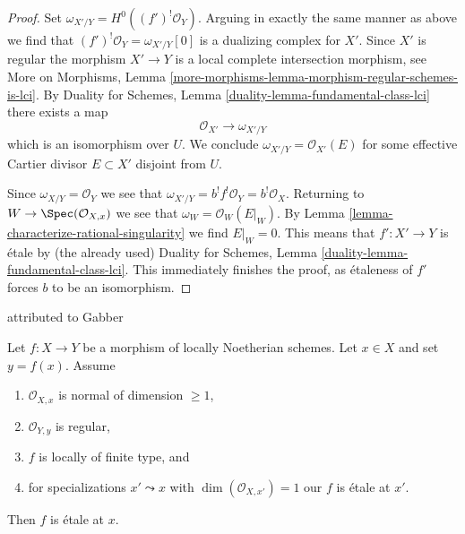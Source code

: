 \begin{proof}
\medskip\noindent
Set $\omega_{X'/Y} = H^0((f')^!\mathcal{O}_Y)$. Arguing in exactly the
same manner as above we find that $(f')^!\mathcal{O}_Y = \omega_{X'/Y}[0]$
is a dualizing complex for $X'$. Since $X'$ is regular
the morphism $X' \to Y$ is a local complete intersection morphism, see
More on Morphisms, Lemma
\ref{more-morphisms-lemma-morphism-regular-schemes-is-lci}.
By Duality for Schemes, Lemma \ref{duality-lemma-fundamental-class-lci}
there exists a map
$$
\mathcal{O}_{X'} \longrightarrow \omega_{X'/Y}
$$
which is an isomorphism over $U$. We conclude
$\omega_{X'/Y} = \mathcal{O}_{X'}(E)$ for some effective
Cartier divisor $E \subset X'$ disjoint from $U$.

\medskip\noindent
Since $\omega_{X/Y} = \mathcal{O}_Y$ we see that
$\omega_{X'/Y} = b^! f^!\mathcal{O}_Y = b^!\mathcal{O}_X$.
Returning to $W \to \Spec(\mathcal{O}_{X, x})$
we see that $\omega_W = \mathcal{O}_W(E|_W)$.
By Lemma \ref{lemma-characterize-rational-singularity}
we find $E|_W = 0$.
This means that $f' : X' \to Y$ is \'etale by (the already used)
Duality for Schemes, Lemma \ref{duality-lemma-fundamental-class-lci}.
This immediately finishes the proof, as \'etaleness
of $f'$ forces $b$ to be an isomorphism.
\end{proof}

\begin{lemma}
\label{lemma-purity-ramification}
\begin{reference}
\cite[Theorem 2.4]{Zong} attributed to Gabber
\end{reference}
Let $f : X \to Y$ be a morphism of locally Noetherian schemes.
Let $x \in X$ and set $y = f(x)$. Assume
\begin{enumerate}
\item $\mathcal{O}_{X, x}$ is normal of dimension $\geq 1$,
\item $\mathcal{O}_{Y, y}$ is regular,
\item $f$ is locally of finite type, and
\item for specializations $x' \leadsto x$ with
$\dim(\mathcal{O}_{X, x'}) = 1$ our $f$ is \'etale at $x'$.
\end{enumerate}
Then $f$ is \'etale at $x$.
\end{lemma}

